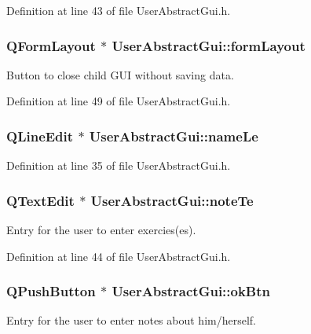 Definition at line 43 of file User\-Abstract\-Gui.\-h.

\hypertarget{class_user_abstract_gui_a06ebded83079e3b09a836e6e4728069f}{
\subsubsection[{form\-Layout}]{\setlength{\rightskip}{0pt plus 5cm}Q\-Form\-Layout $\ast$ User\-Abstract\-Gui\-::form\-Layout\hspace{0.3cm}{\ttfamily [private]}}}\label{class_user_abstract_gui_a06ebded83079e3b09a836e6e4728069f}
Button to close child G\-U\-I without saving data. 

Definition at line 49 of file User\-Abstract\-Gui.\-h.

\hypertarget{class_user_abstract_gui_aef34354ca561f53cab79f1ea7f7daccc}{
\subsubsection[{name\-Le}]{\setlength{\rightskip}{0pt plus 5cm}Q\-Line\-Edit $\ast$ User\-Abstract\-Gui\-::name\-Le\hspace{0.3cm}{\ttfamily [private]}}}\label{class_user_abstract_gui_aef34354ca561f53cab79f1ea7f7daccc}


Definition at line 35 of file User\-Abstract\-Gui.\-h.

\hypertarget{class_user_abstract_gui_aa648183d58b7705df3d47017d1d7e650}{
\subsubsection[{note\-Te}]{\setlength{\rightskip}{0pt plus 5cm}Q\-Text\-Edit $\ast$ User\-Abstract\-Gui\-::note\-Te\hspace{0.3cm}{\ttfamily [private]}}}\label{class_user_abstract_gui_aa648183d58b7705df3d47017d1d7e650}
Entry for the user to enter exercies(es). 

Definition at line 44 of file User\-Abstract\-Gui.\-h.

\hypertarget{class_user_abstract_gui_ac0b0565555718eff6a0c3cd80ca54c47}{
\subsubsection[{ok\-Btn}]{\setlength{\rightskip}{0pt plus 5cm}Q\-Push\-Button $\ast$ User\-Abstract\-Gui\-::ok\-Btn\hspace{0.3cm}{\ttfamily [private]}}}\label{class_user_abstract_gui_ac0b0565555718eff6a0c3cd80ca54c47}
Entry for the user to enter notes about him/herself. 

